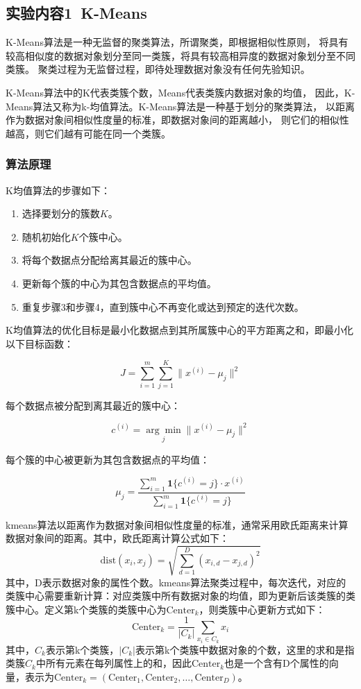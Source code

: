 \documentclass[lang=cn,a4paper]{shu-lab-report}
\begin{document}
\subsection{实验内容1~K-Means}
K-Means算法是一种无监督的聚类算法，所谓聚类，即根据相似性原则，
将具有较高相似度的数据对象划分至同一类簇，将具有较高相异度的数据对象划分至不同类簇。
聚类过程为无监督过程，即待处理数据对象没有任何先验知识。

K-Means算法中的K代表类簇个数，Means代表类簇内数据对象的均值，
因此，K-Means算法又称为k-均值算法。K-Means算法是一种基于划分的聚类算法，
以距离作为数据对象间相似性度量的标准，即数据对象间的距离越小，
则它们的相似性越高，则它们越有可能在同一个类簇。

\subsubsection{算法原理}
K均值算法的步骤如下：

\begin{enumerate}
    \item 选择要划分的簇数$K$。
    \item 随机初始化$K$个簇中心。
    \item 将每个数据点分配给离其最近的簇中心。
    \item 更新每个簇的中心为其包含数据点的平均值。
    \item 重复步骤3和步骤4，直到簇中心不再变化或达到预定的迭代次数。
\end{enumerate}

K均值算法的优化目标是最小化数据点到其所属簇中心的平方距离之和，即最小化以下目标函数：

\begin{equation}
J = \sum_{i=1}^{m} \sum_{j=1}^{K} \|x^{(i)} - \mu_j\|^2
\end{equation}

每个数据点被分配到离其最近的簇中心：

\begin{equation}
c^{(i)} = \underset{j}{\arg\min} \|x^{(i)} - \mu_j\|^2
\end{equation}

每个簇的中心被更新为其包含数据点的平均值：

\begin{equation}
\mu_j = \frac{\sum_{i=1}^{m} \mathbf{1}\{c^{(i)} = j\} \cdot x^{(i)}}{\sum_{i=1}^{m} \mathbf{1}\{c^{(i)} = j\}}
\end{equation}

k\text{-}means算法以距离作为数据对象间相似性度量的标准，通常采用欧氏距离来计算数据对象间的距离。其中，欧氏距离计算公式如下：
\[
\text{dist}\left(x_i,x_j\right) = \sqrt{\sum_{d=1}^{D}{(x_{i,d}-x_{j,d})}^2}
\]
其中，D表示数据对象的属性个数。k\text{-}means算法聚类过程中，每次迭代，对应的类簇中心需要重新计算：对应类簇中所有数据对象的均值，即为更新后该类簇的类簇中心。定义第k个类簇的类簇中心为$\text{Center}_k$，则类簇中心更新方式如下：
\[
\text{Center}_k = \frac{1}{|C_k|}\sum_{x_i \in C_k}x_i
\]
其中，$C_k$表示第k个类簇，$|C_k|$表示第k个类簇中数据对象的个数，这里的求和是指类簇$C_k$中所有元素在每列属性上的和，因此$\text{Center}_k$也是一个含有D个属性的向量，表示为$\text{Center}_k = (\text{Center}_1,\text{Center}_2,\ldots,\text{Center}_D)$。
\end{document}
